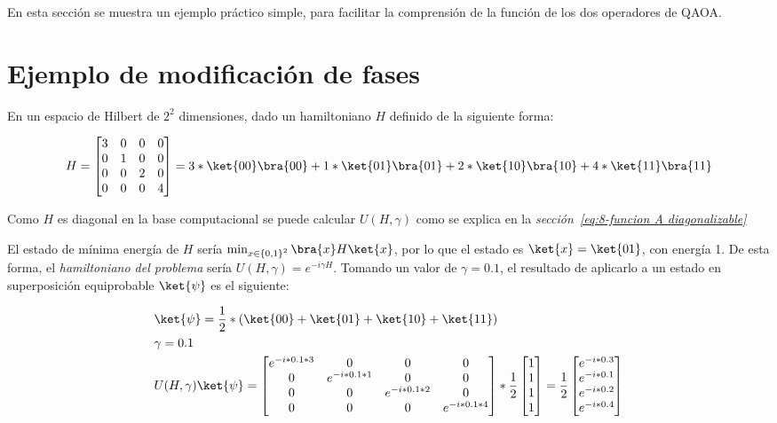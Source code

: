 En esta sección se muestra un ejemplo práctico simple, para facilitar la comprensión de la función de los dos operadores de QAOA\@.

\section{Ejemplo de modificación de fases\label{sec:8-ejemplo de modificacion de fases}}

En un espacio de Hilbert de $2^2$ dimensiones, dado un hamiltoniano $H$ definido de la siguiente forma:

\begin{align*}
  H = \begin{bmatrix}
    3 & 0 & 0 & 0 \\
    0 & 1 & 0 & 0 \\
    0 & 0 & 2 & 0 \\
    0 & 0 & 0 & 4
  \end{bmatrix} = 3*\ket{00}\bra{00} + 1*\ket{01}\bra{01} + 2*\ket{10}\bra{10} + 4*\ket{11}\bra{11}
\end{align*}

Como $H$ es diagonal en la base computacional se puede calcular $U(H, \gamma)$ como se explica en la \textit{sección~\ref{eq:8-funcion A diagonalizable}}

El estado de mínima energía de $H$ sería $\min_{x \in {\{0, 1\}}^2}{\bra{x}H\ket{x}}$, por lo que el estado es $\ket{x} = \ket{01}$, con energía 1.
De esta forma, el \textit{hamiltoniano del problema} sería $U(H, \gamma) = e^{-i \gamma H}$. Tomando un valor de $\gamma = 0.1$, el resultado de aplicarlo a un estado en superposición equiprobable $\ket{\psi}$ es el siguiente:

\begin{align*}
  &\ket{\psi} = \frac{1}{2}*(\ket{00} + \ket{01} + \ket{10} + \ket{11}) \\
  &\gamma = 0.1 \\
  &U(H, \gamma) \ket{\psi} =
    \begin{bmatrix}
      e^{-i * 0.1 * 3} & 0                & 0                & 0 \\
      0                & e^{-i * 0.1 * 1} & 0                & 0 \\
      0                & 0                & e^{-i * 0.1 * 2} & 0 \\
      0                & 0                & 0                & e^{-i * 0.1 * 4}
    \end{bmatrix}
    *\frac{1}{2}
    \begin{bmatrix}
      1 \\
      1 \\
      1 \\
      1
    \end{bmatrix} = \frac{1}{2}
    \begin{bmatrix}
      e^{-i * 0.3} \\
      e^{-i * 0.1} \\
      e^{-i * 0.2} \\
      e^{-i * 0.4}
    \end{bmatrix}
\end{align*}

